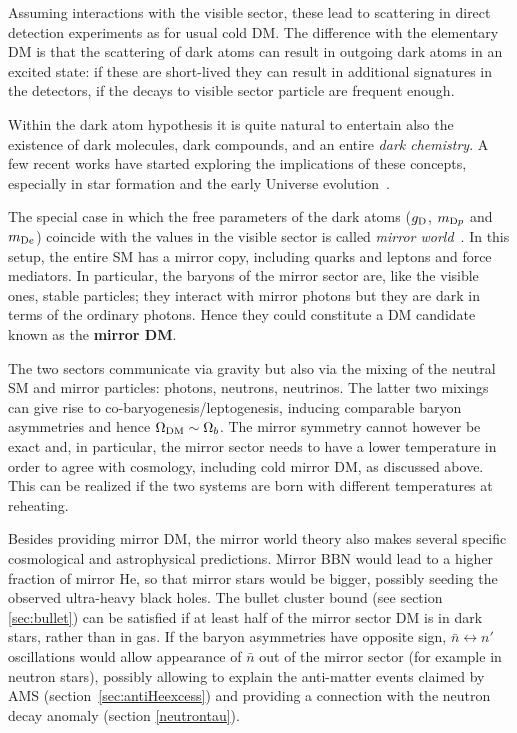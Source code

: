 Assuming interactions with the visible sector, these lead to scattering in direct detection experiments as for usual cold DM. The difference with the elementary DM is that the scattering of dark atoms can result in outgoing dark atoms in an excited state: if these are short-lived they can result in additional signatures in the detectors, if the decays to visible sector particle are frequent enough. 

Within the dark atom hypothesis it is quite natural to entertain also the existence of dark molecules, dark compounds, and an entire {\em dark chemistry}. A few recent works have started exploring the implications of these concepts, especially in star formation and the early Universe evolution~\cite{dark:atoms}.



\bigskip

 
\label{sec:mirror:DM}
The special case in which the free parameters of the dark atoms ($g_{\rm D}$, $m_{{\rm D}p}$ and $m_{{\rm D}e}$) coincide with the values in the visible sector is called  {\em mirror world}~\cite{MirrorSM}. 
In this setup, the entire SM has a mirror copy, including quarks and leptons and force mediators. In particular, the baryons of the mirror sector are, like the visible ones, stable particles; they interact with mirror photons but they are dark in terms of the ordinary photons. 
Hence they could constitute a DM candidate known as the {\bf mirror DM}. 


The two sectors communicate via gravity but also via the mixing of the neutral SM and mirror particles: photons, neutrons, neutrinos.
The latter two mixings can give rise to co-baryogenesis/leptogenesis, inducing comparable baryon asymmetries and hence $\Omega_{\rm DM}\sim \Omega_b$.
The mirror symmetry cannot however be exact and, in particular, the mirror sector needs to have a lower temperature in order to agree with cosmology, including cold mirror DM, as discussed above. This can be realized if the two systems are born with different temperatures at reheating.
 
Besides providing mirror DM, the mirror world theory also makes several specific cosmological and astrophysical predictions. 
Mirror BBN would lead to a higher fraction of mirror He, so that mirror stars would be bigger, possibly seeding the observed
ultra-heavy black holes. The bullet cluster bound (see section \ref{sec:bullet}) can be satisfied if at least half of the mirror sector DM is in dark stars, rather than in gas.
If the baryon asymmetries have opposite sign, $\bar n \leftrightarrow  n'$ oscillations would allow appearance of $\bar n$
out of the mirror sector (for example in neutron stars), possibly allowing to explain the anti-matter events claimed by AMS (section~\ref{sec:antiHeexcess}) and providing a connection with the neutron decay anomaly (section \ref{neutrontau}).

